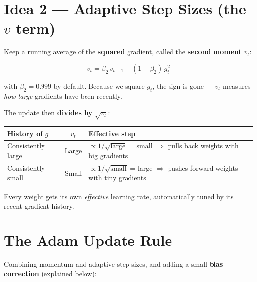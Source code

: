 \documentclass[12pt, a4paper]{article}
\theoremstyle{definition}
\begin{document}
\section{Idea 2 --- Adaptive Step Sizes (the $v$ term)}

Keep a running average of the \textbf{squared} gradient, called the
\textbf{second moment} $v_t$:

\[
  v_t = \beta_2 \, v_{t-1} + (1 - \beta_2)\, g_t^2
\]

with $\beta_2 = 0.999$ by default.
Because we square $g_t$, the sign is gone --- $v_t$ measures
\emph{how large} gradients have been recently.

The update then \textbf{divides by $\sqrt{v_t}$}:

\begin{center}
  \renewcommand{\arraystretch}{1.3}
  \begin{tabular}{lcp{6cm}}
    \toprule
    History of $g$     & $v_t$ & Effective step                          \\
    \midrule
    Consistently large & Large & $\propto 1/\sqrt{\text{large}}$ = small
    $\Rightarrow$ pulls back weights with big gradients                  \\
    Consistently small & Small & $\propto 1/\sqrt{\text{small}}$ = large
    $\Rightarrow$ pushes forward weights with tiny gradients             \\
    \bottomrule
  \end{tabular}
\end{center}

Every weight gets its own \emph{effective} learning rate, automatically tuned
by its recent gradient history.

\section{The Adam Update Rule}

Combining momentum and adaptive step sizes, and adding a small
\textbf{bias correction} (explained below):
\end{document}
